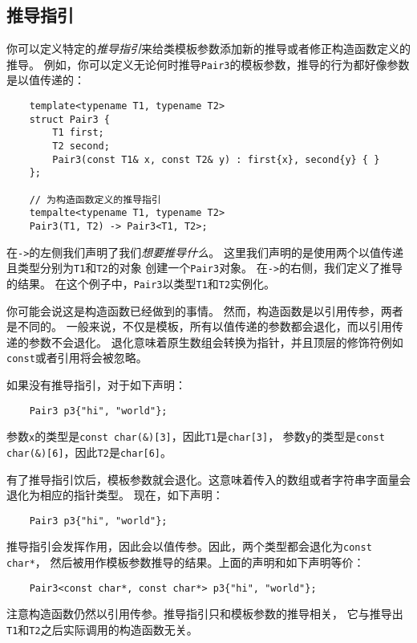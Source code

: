 \subsection{推导指引}
你可以定义特定的\emph{推导指引}来给类模板参数添加新的推导或者修正构造函数定义的推导。
例如，你可以定义无论何时推导\texttt{Pair3}的模板参数，推导的行为都好像参数是以值传递的：
\begin{lstlisting}
    template<typename T1, typename T2>
    struct Pair3 {
        T1 first;
        T2 second;
        Pair3(const T1& x, const T2& y) : first{x}, second{y} { }
    };

    // 为构造函数定义的推导指引
    tempalte<typename T1, typename T2>
    Pair3(T1, T2) -> Pair3<T1, T2>;
\end{lstlisting}
在\texttt{->}的左侧我们声明了我们\emph{想要推导什么}。
这里我们声明的是使用两个以值传递且类型分别为\texttt{T1}和\texttt{T2}的对象
创建一个\texttt{Pair3}对象。
在\texttt{->}的右侧，我们定义了推导的结果。
在这个例子中，\texttt{Pair3}以类型\texttt{T1}和\texttt{T2}实例化。

你可能会说这是构造函数已经做到的事情。
然而，构造函数是以引用传参，两者是不同的。
一般来说，不仅是模板，所有以值传递的参数都会退化，而以引用传递的参数不会退化。
退化意味着原生数组会转换为指针，并且顶层的修饰符例如\texttt{const}或者引用将会被忽略。

如果没有推导指引，对于如下声明：
\begin{lstlisting}
    Pair3 p3{"hi", "world"};
\end{lstlisting}
参数\texttt{x}的类型是\texttt{const char(\&)[3]}，因此\texttt{T1}是\texttt{char[3]}，
参数\texttt{y}的类型是\texttt{const char(\&)[6]}，因此\texttt{T2}是\texttt{char[6]}。

有了推导指引饮后，模板参数就会退化。这意味着传入的数组或者字符串字面量会退化为相应的指针类型。
现在，如下声明：
\begin{lstlisting}
    Pair3 p3{"hi", "world"};
\end{lstlisting}
推导指引会发挥作用，因此会以值传参。因此，两个类型都会退化为\texttt{const char*}，
然后被用作模板参数推导的结果。上面的声明和如下声明等价：
\begin{lstlisting}
    Pair3<const char*, const char*> p3{"hi", "world"};
\end{lstlisting}
注意构造函数仍然以引用传参。推导指引只和模板参数的推导相关，
它与推导出\texttt{T1}和\texttt{T2}之后实际调用的构造函数无关。

